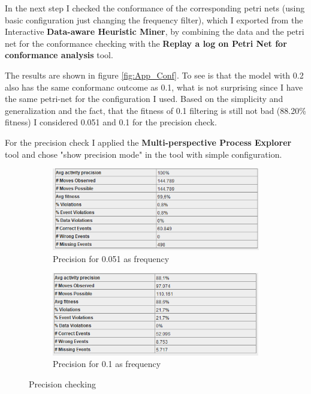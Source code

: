 In the next step I checked the conformance of the corresponding petri nets (using basic configuration just changing the frequency filter), which I exported from the Interactive \textbf{Data-aware Heuristic Miner}, by combining the data and the petri net for the conformance checking with the \textbf{Replay a log on Petri Net for conformance analysis} tool. 

The results are shown in figure \ref{fig:App_Conf}. To see is that the model with 0.2 also has the same conformanc outcome as 0.1, what is not surprising since I have the same petri-net for the configuration I used. Based on the simplicity and generalization and the fact, that the fitness of 0.1 filtering is still not bad (88.20\% fitness) I considered 0.051 and 0.1 for the precision check.

For the precision check I applied the \textbf{Multi-perspective Process Explorer} tool and chose "show precision mode" in the tool with simple configuration.

\begin{figure}[!htbp]
\centering
\begin{subfigure}{.4\textwidth}
  \centering
  \includegraphics[width=\linewidth]{App_Precision0-051.PNG}
  \caption{Precision for 0.051 as frequency}
  \label{fig:APP_Prec0-051}
\end{subfigure}%
\begin{subfigure}{.4\textwidth}
  \centering
  \includegraphics[width=\linewidth]{App_Precision0-1.PNG}
  \caption{Precision for 0.1 as frequency}
  \label{fig:APP_Prec0-1}
\end{subfigure}
\caption{Precision checking}
\label{fig:App_Prec}
\end{figure}

